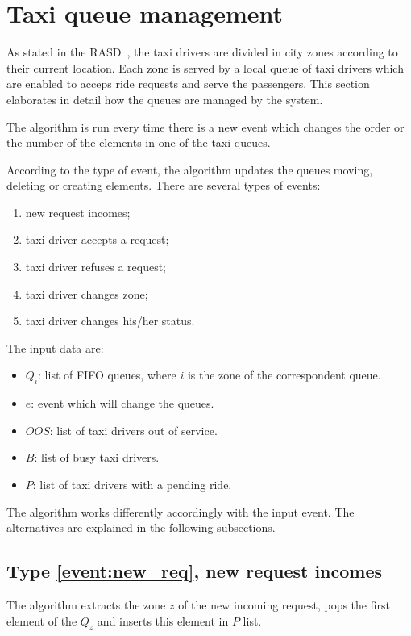 \section{Taxi queue management}
As stated in the RASD~\cite{rasd}, the taxi drivers are divided in city zones according to their current location. Each zone is served by a local queue of taxi drivers which are enabled to acceps ride requests and serve the passengers. This section elaborates in detail how the queues are managed by the system.

The algorithm is run every time there is a new event which changes the order or the number of the elements in one of the taxi queues.

According to the type of event, the algorithm updates the queues moving, deleting or creating elements. There are several types of events:
\begin{enumerate}
	\item new request incomes; \label{event:new_req}
	\item taxi driver accepts a request; \label{event:accepted_req}
	\item taxi driver refuses a request; \label{event:refuses_req}
	\item taxi driver changes zone; \label{event:changed_zone}
	\item taxi driver changes his/her status. \label{event:changed_status}
\end{enumerate}
The input data are:
\begin{itemize}
	\item $Q_i$: list of FIFO queues, where $i$ is the zone of the correspondent queue.
	\item $e$: event which will change the queues.
	\item $OOS$: list of taxi drivers out of service.
	\item $B$: list of busy taxi drivers.
	\item $P$: list of taxi drivers with a pending ride.
\end{itemize}

The algorithm works differently accordingly with the input event. The alternatives are explained in the following subsections.

\subsection{Type \ref{event:new_req}, new request incomes}
The algorithm extracts the zone $z$ of the new incoming request, pops the first element of the $Q_z$ and inserts this element in $P$ list.

